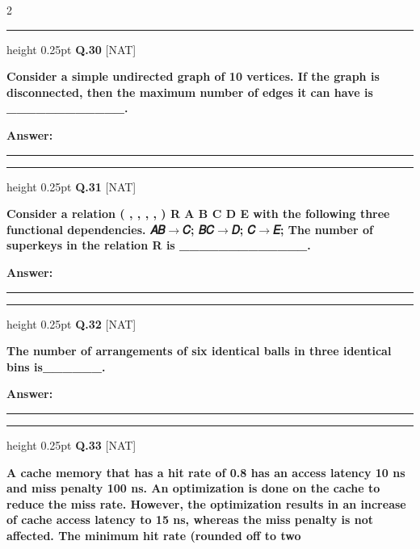 \documentclass[a4paper,10pt,twoside]{article}
\begin{document}
\begin{multicols}{2}
\par\vspace{6pt}\hrule height 0.25pt\vspace{6pt}
\noindent\textbf{Q.30} \hfill {\footnotesize\textsf{[NAT]}}
\par\vspace{2pt}
{\bfseries Consider a simple undirected graph of 10 vertices. If the graph is disconnected, then
the maximum number of edges it can have is \_\_\_\_\_\_\_\_\_\_\_\_. \par}
\par\vspace{3pt}\noindent\textbf{Answer:} \rule{3.2cm}{0.4pt}
\par\vspace{6pt}\hrule height 0.25pt\vspace{6pt}
\noindent\textbf{Q.31} \hfill {\footnotesize\textsf{[NAT]}}
\par\vspace{2pt}
{\bfseries Consider a relation
( ,
,
,
,
)
R A B C D E with the following three functional
dependencies.
𝐴𝐵$\to$𝐶; 𝐵𝐶$\to$𝐷; 𝐶$\to$𝐸;
The number of superkeys in the relation R is \_\_\_\_\_\_\_\_\_\_\_\_\_. \par}
\par\vspace{3pt}\noindent\textbf{Answer:} \rule{3.2cm}{0.4pt}
\par\vspace{6pt}\hrule height 0.25pt\vspace{6pt}
\noindent\textbf{Q.32} \hfill {\footnotesize\textsf{[NAT]}}
\par\vspace{2pt}
{\bfseries The number of arrangements of six identical balls in three identical bins is\_\_\_\_\_\_. \par}
\par\vspace{3pt}\noindent\textbf{Answer:} \rule{3.2cm}{0.4pt}
\par\vspace{6pt}\hrule height 0.25pt\vspace{6pt}
\noindent\textbf{Q.33} \hfill {\footnotesize\textsf{[NAT]}}
\par\vspace{2pt}
{\bfseries A cache memory that has a hit rate of 0.8 has an access latency 10 ns and miss
penalty 100 ns. An optimization is done on the cache to reduce the miss rate.
However, the optimization results in an increase of cache access latency to 15 ns,
whereas the miss penalty is not affected. The minimum hit rate (rounded off to two
}
\end{multicols}
\end{document}
